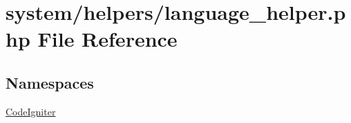 \hypertarget{language__helper_8php}{\section{system/helpers/language\-\_\-helper.php File Reference}
\label{language__helper_8php}
}
\subsection*{Namespaces}
\begin{DoxyCompactItemize}
\item 
\hyperlink{namespace_code_igniter}{Code\-Igniter}
\end{DoxyCompactItemize}
